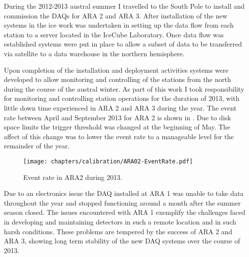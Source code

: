 During the 2012-2013 austral summer I travelled to the South Pole to install and commission the DAQs for ARA 2 and ARA 3. After installation of the new systems in the ice work was undertaken in setting up the data flow from each station to a server located in the IceCube Laboratory. Once data flow was established systems were put in place to allow a subset of data to be transferred via satellite to a data warehouse in the northern hemisphere. 

Upon completion of the installation and deployment activities systems were developed to allow monitoring and controlling of the stations from the north during the course of the austral winter. As part of this work I took responsibility for monitoring and controlling station operations for the duration of 2013, with little down time experienced in ARA 2 and ARA 3 during the year. The event rate between April and September 2013 for ARA 2 is shown in . Due to disk space limits the trigger threshold was changed at the beginning of May. The affect of this change was to lower the event rate to a manageable level for the remainder of the year. 

\begin{figure}
  \texttt{[image: chapters/calibration/ARA02-EventRate.pdf]}
  \caption{Event rate in ARA2 during 2013.}
  \label{fig:calibration:ARA1-3-development:ARA2-Rate}
\end{figure}

Due to an electronics issue the DAQ installed at ARA 1 was unable to take data throughout the year and stopped functioning around a month after the summer season closed. The issues encountered with ARA 1 exemplify the challenges faced in developing and maintaining detectors in such a remote location and in such harsh conditions. These problems are tempered by the success of ARA 2 and ARA 3, showing long term stability of the new DAQ systems over the course of 2013.






